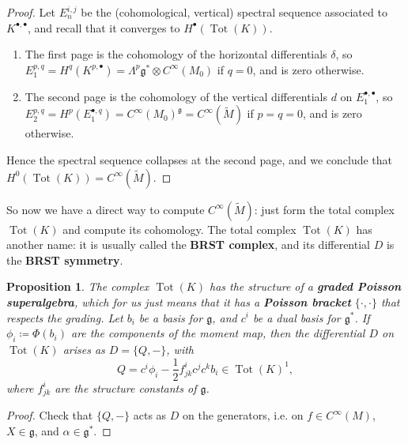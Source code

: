 \documentclass{report}
\theoremstyle{plain}
\newtheorem{proposition}[theorem]{Proposition}
\theoremstyle{definition}
\theoremstyle{remark}
\newcommand{\fg}{\mathfrak{g}}
\DeclareMathOperator{\Tot}{Tot}
\begin{document}
\begin{proof}
  Let $E_n^{i,j}$ be the (cohomological, vertical) spectral sequence
  associated to $K^{\bullet,\bullet}$, and recall that it converges to
  $H^\bullet(\Tot(K))$.
  \begin{enumerate}
  \item The first page is the cohomology of the horizontal
    differentials $\delta$, so $E_1^{p,q} = H^q(K^{p,\bullet}) =
    \Lambda^p \fg^* \otimes C^\infty(M_0)$ if $q = 0$, and is zero
    otherwise.
  \item The second page is the cohomology of the vertical
    differentials $d$ on $E_1^{\bullet,\bullet}$, so $E_2^{p,q} =
    H^p(E_1^{\bullet,q}) = C^\infty(M_0)^{\fg} = C^\infty(\tilde{M})$
    if $p = q = 0$, and is zero otherwise.
  \end{enumerate}
  Hence the spectral sequence collapses at the second page, and we
  conclude that $H^0(\Tot(K)) = C^\infty(\tilde{M})$.
\end{proof}

So now we have a direct way to compute $C^\infty(\tilde{M})$: just
form the total complex $\Tot(K)$ and compute its cohomology. The total
complex $\Tot(K)$ has another name: it is usually called the {\bf BRST
  complex}, and its differential $D$ is the {\bf BRST symmetry}.

\begin{proposition}
  The complex $\Tot(K)$ has the structure of a {\bf graded Poisson
    superalgebra}, which for us just means that it has a {\bf Poisson
    bracket} $\{\cdot, \cdot\}$ that respects the grading. Let $b_i$
  be a basis for $\fg$, and $c^i$ be a dual basis for $\fg^*$. If
  $\phi_i \coloneqq \Phi(b_i)$ are the components of the moment map,
  then the differential $D$ on $\Tot(K)$ arises as $D = \{Q, -\}$,
  with
  \[ Q = c^i \phi_i - \frac{1}{2} f^i_{jk} c^j c^k b_i \in \Tot(K)^1, \]
  where $f^i_{jk}$ are the structure constants of $\fg$.
\end{proposition}

\begin{proof}
  Check that $\{Q, -\}$ acts as $D$ on the generators, i.e. on $f \in
  C^\infty(M)$, $X \in \fg$, and $\alpha \in \fg^*$.
\end{proof}
\end{document}

